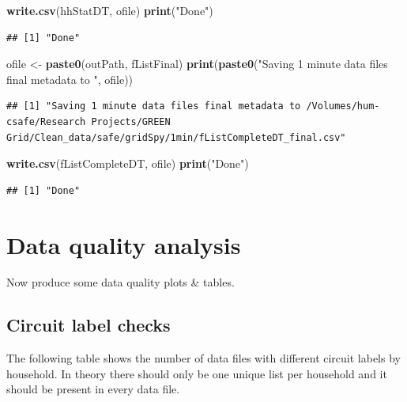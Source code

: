 \documentclass[]{article}
\newenvironment{Shaded}{\begin{snugshade}}{\end{snugshade}}
\newcommand{\KeywordTok}[1]{\textcolor[rgb]{0.13,0.29,0.53}{\textbf{#1}}}
\newcommand{\StringTok}[1]{\textcolor[rgb]{0.31,0.60,0.02}{#1}}
\newcommand{\NormalTok}[1]{#1}
\begin{document}
\begin{Shaded}
\begin{Highlighting}[]
\KeywordTok{write.csv}\NormalTok{(hhStatDT, ofile)}
\KeywordTok{print}\NormalTok{(}\StringTok{"Done"}\NormalTok{)}
\end{Highlighting}
\end{Shaded}

\begin{verbatim}
## [1] "Done"
\end{verbatim}

\begin{Shaded}
\begin{Highlighting}[]
\NormalTok{ofile <-}\StringTok{ }\KeywordTok{paste0}\NormalTok{(outPath, fListFinal)}
\KeywordTok{print}\NormalTok{(}\KeywordTok{paste0}\NormalTok{(}\StringTok{"Saving 1 minute data files final metadata to "}\NormalTok{, ofile))}
\end{Highlighting}
\end{Shaded}

\begin{verbatim}
## [1] "Saving 1 minute data files final metadata to /Volumes/hum-csafe/Research Projects/GREEN Grid/Clean_data/safe/gridSpy/1min/fListCompleteDT_final.csv"
\end{verbatim}

\begin{Shaded}
\begin{Highlighting}[]
\KeywordTok{write.csv}\NormalTok{(fListCompleteDT, ofile)}
\KeywordTok{print}\NormalTok{(}\StringTok{"Done"}\NormalTok{)}
\end{Highlighting}
\end{Shaded}

\begin{verbatim}
## [1] "Done"
\end{verbatim}

\section{Data quality analysis}\label{data-quality-analysis}

Now produce some data quality plots \& tables.

\subsection{Circuit label checks}\label{circuit-label-checks}

The following table shows the number of data files with different
circuit labels by household. In theory there should only be one unique
list per household and it should be present in every data file.
\end{document}
